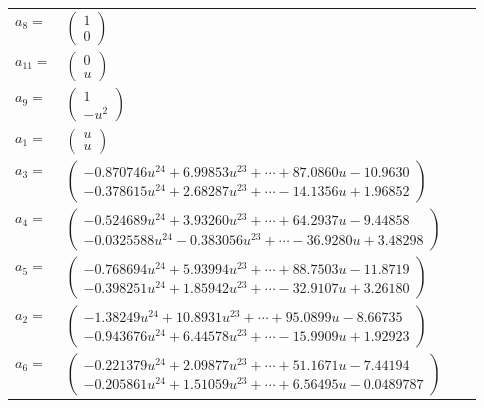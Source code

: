 \documentclass[1p]{elsarticle_modified}
\theoremstyle{definition}
\begin{document}
\begin{tabular}{m{7pt} m{180pt} m{7pt} m{180pt} }
\flushright $a_{8}=$&$\begin{pmatrix}1\\0\end{pmatrix}$ \\
\flushright $a_{11}=$&$\begin{pmatrix}0\\u\end{pmatrix}$ \\
\flushright $a_{9}=$&$\begin{pmatrix}1\\- u^2\end{pmatrix}$ \\
\flushright $a_{1}=$&$\begin{pmatrix}u\\u\end{pmatrix}$ \\
\flushright $a_{3}=$&$\begin{pmatrix}-0.870746 u^{24}+6.99853 u^{23}+\cdots+87.0860 u-10.9630\\-0.378615 u^{24}+2.68287 u^{23}+\cdots-14.1356 u+1.96852\end{pmatrix}$ \\
\flushright $a_{4}=$&$\begin{pmatrix}-0.524689 u^{24}+3.93260 u^{23}+\cdots+64.2937 u-9.44858\\-0.0325588 u^{24}-0.383056 u^{23}+\cdots-36.9280 u+3.48298\end{pmatrix}$ \\
\flushright $a_{5}=$&$\begin{pmatrix}-0.768694 u^{24}+5.93994 u^{23}+\cdots+88.7503 u-11.8719\\-0.398251 u^{24}+1.85942 u^{23}+\cdots-32.9107 u+3.26180\end{pmatrix}$ \\
\flushright $a_{2}=$&$\begin{pmatrix}-1.38249 u^{24}+10.8931 u^{23}+\cdots+95.0899 u-8.66735\\-0.943676 u^{24}+6.44578 u^{23}+\cdots-15.9909 u+1.92923\end{pmatrix}$ \\
\flushright $a_{6}=$&$\begin{pmatrix}-0.221379 u^{24}+2.09877 u^{23}+\cdots+51.1671 u-7.44194\\-0.205861 u^{24}+1.51059 u^{23}+\cdots+6.56495 u-0.0489787\end{pmatrix}$ \\

\end{tabular}
\end{document}
